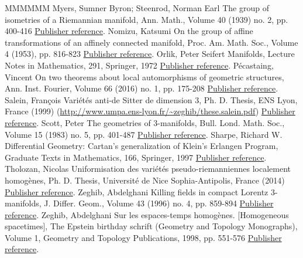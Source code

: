 \documentclass[11pt]{article}
\theoremstyle{definition}
\numberwithin{equation}{section}
\numberwithin{figure}{section}
\numberwithin{table}{section}
\begin{document}
\begin{thebibliography}{MMMMMM}
 Myers, Sumner Byron; Steenrod, Norman Earl The group of isometries of a Riemannian manifold, Ann. Math., Volume 40 (1939) no. 2, pp. 400-416 \href{https://ahl.centre-mersenne.org/item/AHL_2020__3__407_0/#myers-steenrod}{Publisher reference}.
 Nomizu, Katsumi On the group of affine transformations of an affinely connected manifold, Proc. Am. Math. Soc., Volume 4 (1953), pp. 816-823 \href{https://ahl.centre-mersenne.org/item/AHL_2020__3__407_0/#nomizu2}{Publisher reference}.
 Orlik, Peter Seifert Manifolds, Lecture Notes in Mathematics, 291, Springer, 1972 \href{https://ahl.centre-mersenne.org/item/AHL_2020__3__407_0/#orlik}{Publisher reference}.
 Pécastaing, Vincent On two theorems about local automorphisms of geometric structures, Ann. Inst. Fourier, Volume 66 (2016) no. 1, pp. 175-208 \href{https://ahl.centre-mersenne.org/item/AHL_2020__3__407_0/#vincent}{Publisher reference}.
 Salein, François Variétés anti-de Sitter de dimension 3, Ph. D. Thesis, ENS Lyon, France (1999) (\url{http://www.umpa.ens-lyon.fr/~zeghib/these.salein.pdf}) \href{https://ahl.centre-mersenne.org/item/AHL_2020__3__407_0/#saleinthese}{Publisher reference}.
 Scott, Peter The geometries of 3-manifolds, Bull. Lond. Math. Soc., Volume 15 (1983) no. 5, pp. 401-487 \href{https://ahl.centre-mersenne.org/item/AHL_2020__3__407_0/#scott}{Publisher reference}.
 Sharpe, Richard W. Differential Geometry: Cartan’s generalization of Klein’s Erlangen Program, Graduate Texts in Mathematics, 166, Springer, 1997 \href{https://ahl.centre-mersenne.org/item/AHL_2020__3__407_0/#sharpe}{Publisher reference}.
 Tholozan, Nicolas Uniformisation des variétés pseudo-riemanniennes localement homogènes, Ph. D. Thesis, Université de Nice Sophia-Antipolis, France (2014) \href{https://ahl.centre-mersenne.org/item/AHL_2020__3__407_0/#tholozan}{Publisher reference}.
 Zeghib, Abdelghani Killing fields in compact Lorentz 3-manifolds, J. Differ. Geom., Volume 43 (1996) no. 4, pp. 859-894 \href{https://ahl.centre-mersenne.org/item/AHL_2020__3__407_0/#zeghibflot}{Publisher reference}.
 Zeghib, Abdelghani Sur les espaces-temps homogènes. [Homogeneous spacetimes], The Epstein birthday schrift (Geometry and Topology Monographs), Volume 1, Geometry and Topology Publications, 1998, pp. 551-576 \href{https://ahl.centre-mersenne.org/item/AHL_2020__3__407_0/#zeghib.isom}{Publisher reference}.

\end{thebibliography}
\end{document}
